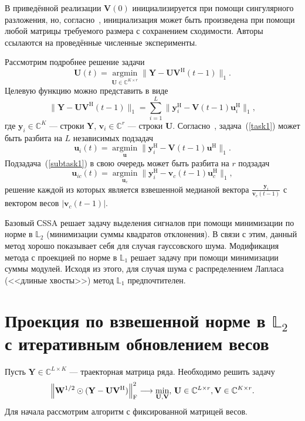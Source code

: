 \documentclass[specialist,
               substylefile = spbu.rtx,
               subf,href,colorlinks=true, 12pt]{disser}
\DeclareMathOperator*{\argmin}{argmin}
\begin{document}
В приведённой реализации $\mathbf{V}(0)$ инициализируется при помощи сингулярного разложения, но, согласно~\cite{KeKanade}, инициализация может быть произведена при помощи любой матрицы требуемого размера с сохранением сходимости. Авторы~\cite{KeKanade} ссылаются на проведённые численные эксперименты.


Рассмотрим подробнее решение задачи
\begin{equation}\label{task1}
	\mathbf{U}(t) = \argmin\limits_{\mathbf{U}\in \mathbb{C}^{K\times r}} \|\mathbf{Y}-\mathbf{U}\mathbf{V}^{\mathrm{H}}(t-1)\|_1.
\end{equation}
Целевую функцию можно представить в виде $$\|\mathbf{Y}-\mathbf{U}\mathbf{V}^{\mathrm{H}}(t-1)\|_1 = \sum\limits_{i=1}^{L} \|\mathbf{y}_i^{\mathrm{H}}-\mathbf{V}(t-1)\mathbf{u}^{\mathrm{H}}_i \|_1, $$ где $\mathbf{y}_i\in \mathbb{C}^K$ --- строки $\mathbf{Y}$, $\mathbf{v}_i\in\mathbb{C}^r$ --- строки $\mathbf{U}$.
Согласно~\cite{KeKanade}, задача~(\ref{task1}) может быть разбита на $L$ независимых подзадач
\begin{equation}\label{subtask1}
	\mathbf{u}_i(t) = \argmin\limits_{\mathbf{u}}\|\mathbf{y}_i^{\mathrm{H}}-\mathbf{V}(t-1)\mathbf{u}^{\mathrm{H}} \|_1.
\end{equation}
 Подзадача~(\ref{subtask1}) в свою очередь может быть разбита на $r$ подзадач
\begin{equation}\label{subtask1}
	\mathbf{u}_{ic}(t) = \argmin\limits_{\mathbf{u}_c}\|\mathbf{y}_{i}^{\mathrm{H}}-\mathbf{v}_c(t-1)\mathbf{u}_c^{\mathrm{H}} \|_1,
\end{equation}
решение каждой из которых является взвешенной медианой вектора $\frac{\mathbf{y}_i}{\mathbf{v}_c(t-1)}$ с вектором весов $|\mathbf{v}_c(t-1)|$.

Базовый СSSA решает задачу выделения сигналов при помощи минимизации по норме в $\mathbb{L}_2$ (минимизации суммы квадратов отклонения). В связи с этим, данный метод хорошо показывает себя для случая гауссовского шума. Модификация метода с проекцией по норме в $\mathbb{L}_1$ решает задачу при помощи минимизации суммы модулей. Исходя из этого, для случая шума с распределением Лапласа (<<длиные хвосты>>) метод $\mathbb{L}_1$ предпочтителен.

\section{Проекция по взвешенной норме в $\mathbb{L}_2$ с итеративным обновлением весов}

Пусть $\mathbf{Y} \in \mathbb{C}^{L\times K}$ --- траекторная матрица ряда.
Необходимо решить задачу
\begin{equation*}
		\norm{\mathbf{W}^{1/2}\odot(\mathbf{Y}-\mathbf{U}\mathbf{V}^{\mathrm{H}})}^2_\mathrm{F} \longrightarrow \min_{\mathbf{U},\mathbf{V}}, \, \mathbf{U} \in \mathbb{C}^{L\times r}, \mathbf{V} \in \mathbb{C}^{K\times r}.
\end{equation*}
Для начала рассмотрим алгоритм с фиксированной матрицей весов.
\end{document}
